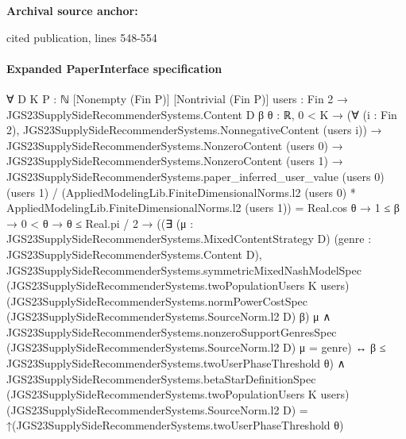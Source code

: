 \documentclass[10pt]{article}
\begin{document}
\textbf{Archival source anchor:} {\footnotesize\raggedright cited publication, lines 548-\allowbreak{}554\par}
\paragraph{Expanded PaperInterface specification}
\begin{ReviewVerbatim}
∀ {D K P : ℕ} [Nonempty (Fin P)] [Nontrivial (Fin P)] {users : Fin 2 → JGS23SupplySideRecommenderSystems.Content D}
  {β θ : ℝ},
  0 < K →
    (∀ (i : Fin 2), JGS23SupplySideRecommenderSystems.NonnegativeContent (users i)) →
      JGS23SupplySideRecommenderSystems.NonzeroContent (users 0) →
        JGS23SupplySideRecommenderSystems.NonzeroContent (users 1) →
          JGS23SupplySideRecommenderSystems.paper_inferred_user_value (users 0) (users 1) /
                (AppliedModelingLib.FiniteDimensionalNorms.l2 (users 0) *
                  AppliedModelingLib.FiniteDimensionalNorms.l2 (users 1)) =
              Real.cos θ →
            1 ≤ β →
              0 < θ →
                θ ≤ Real.pi / 2 →
                  ((∃ (μ : JGS23SupplySideRecommenderSystems.MixedContentStrategy D) (genre :
                        JGS23SupplySideRecommenderSystems.Content D),
                        JGS23SupplySideRecommenderSystems.symmetricMixedNashModelSpec
                            (JGS23SupplySideRecommenderSystems.twoPopulationUsers K users)
                            (JGS23SupplySideRecommenderSystems.normPowerCostSpec
                              (JGS23SupplySideRecommenderSystems.SourceNorm.l2 D) β)
                            μ ∧
                          JGS23SupplySideRecommenderSystems.nonzeroSupportGenresSpec
                              (JGS23SupplySideRecommenderSystems.SourceNorm.l2 D) μ =
                            {genre}) ↔
                      β ≤ JGS23SupplySideRecommenderSystems.twoUserPhaseThreshold θ) ∧
                    JGS23SupplySideRecommenderSystems.betaStarDefinitionSpec
                        (JGS23SupplySideRecommenderSystems.twoPopulationUsers K users)
                        (JGS23SupplySideRecommenderSystems.SourceNorm.l2 D) =
                      ↑(JGS23SupplySideRecommenderSystems.twoUserPhaseThreshold θ)
\end{ReviewVerbatim}
\end{document}
